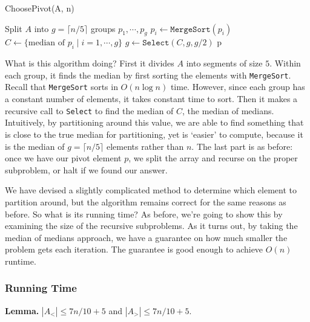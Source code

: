 \documentclass [12pt]{article}
\begin{document}
\begin{algorithm}
\caption{ChoosePivot(A, n)}\label{alg:choose_pivot}
\begin{algorithmic}
\STATE Split $A$ into $g = \lceil n / 5 \rceil$ groups $p_1, \cdots, p_g$
    \STATE $p_i \gets \texttt{MergeSort}(p_i)$
\ENDFOR
\STATE $C \gets \{ \text{median of } p_i \mid i = 1, \cdots, g \}$
\STATE $g \gets \texttt{Select}(C, g, g/2)$
\RETURN p
\end{algorithmic}
\end{algorithm}

What is this algorithm doing? First it divides $A$ into segments of size $5$. Within each group, it finds the median by first sorting the elements with \texttt{MergeSort}. Recall that \texttt{MergeSort} sorts in $O(n \log n)$ time. However, since each group has a constant number of elements, it takes constant time to sort. Then it makes a recursive call to \texttt{Select} to find the median of $C$, the median of medians. Intuitively, by partitioning around this value, we are able to find something that is close to the true median for partitioning, yet is `easier' to compute, because it is the median of $g = \lceil n/5 \rceil$ elements rather than $n$. The last part is as before: once we have our pivot element $p$, we split the array and recurse on the proper subproblem, or halt if we found our answer. 

We have devised a slightly complicated method to determine which element to partition
around, but the algorithm remains correct for the same reasons as before. So what is its running time? As before, we're going to show this by examining the size of the recursive subproblems. As it turns out, by taking the median of medians approach, we have a guarantee on how much smaller the problem gets each iteration. The guarantee is good enough to achieve $O(n)$ runtime.

\subsubsection{Running Time}

\textbf{Lemma.} $|A_<| \leq 7n/10 + 5$ and $|A_>| \leq 7n/10 + 5$.
\end{document}
